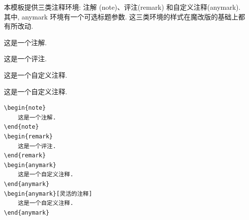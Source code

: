 \documentclass[../book.tex]{subfiles}
\begin{document}
本模板提供三类注释环境: 注解 (note)、评注(remark) 和自定义注释(anymark). 其中, anymark 环境有一个可选标题参数. 这三类环境的样式在魔改版的基础上都有所改动.

\begin{note}
    这是一个注解.
\end{note}

\begin{remark}
    这是一个评注.
\end{remark}

\begin{anymark}
    这是一个自定义注释.
\end{anymark}

\begin{anymark}[灵活的注释]
    这是一个自定义注释.
\end{anymark}

\begin{lstlisting}
\begin{note}
    这是一个注解.
\end{note}
\begin{remark}
    这是一个评注.
\end{remark}
\begin{anymark}
    这是一个自定义注释.
\end{anymark}
\begin{anymark}[灵活的注释]
    这是一个自定义注释.
\end{anymark}
\end{lstlisting}
\end{document}
